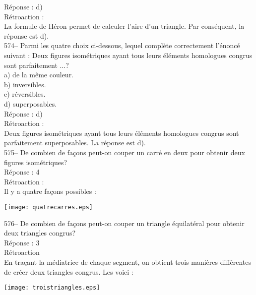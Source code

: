 ﻿\documentclass[letterpaper, 12pt]{article}
\begin{document}
R\'eponse : d) \\

R\'etroaction : \\
La formule de H\'eron permet de calculer l'aire d'un triangle.  Par
cons\'equent, la r\'eponse est d).\\



574-- Parmi les quatre choix ci-dessous, lequel compl\`ete
correctement l'\'enonc\'e suivant : \og Deux figures isom\'etriques
ayant tous leurs \'el\'ements homologues congrus sont parfaitement $\ldots$\fg ?\\
a) de la m\^eme couleur.\\
b) inversibles.\\
c) r\'eversibles.\\
d) superposables.\\

R\'eponse : d)\\

R\'etroaction : \\
Deux figures isom\'etriques ayant tous leurs \'el\'ements homologues congrus
sont parfaitement superposables.  La r\'eponse est d).\\

575-- De combien de fa\c cons peut-on couper un carr\'e en deux pour obtenir
deux figures isom\'etriques?\\

R\'eponse : 4\\

R\'etroaction : \\
Il y a quatre fa\c cons possibles :   \\
    \begin{center}
    \texttt{[image: quatrecarres.eps]}
    \end{center}


576-- De combien de fa\c cons peut-on couper un triangle \'equilat\'eral
pour obtenir deux triangles congrus?\\

R\'eponse : 3\\

R\'etroaction\\
En tra\c cant la m\'ediatrice de chaque segment, on obtient trois mani\`eres
diff\'erentes de cr\'eer deux triangles congrus.  Les voici :\\
    \begin{center}
    \texttt{[image: troistriangles.eps]}
    \end{center}
\end{document}
